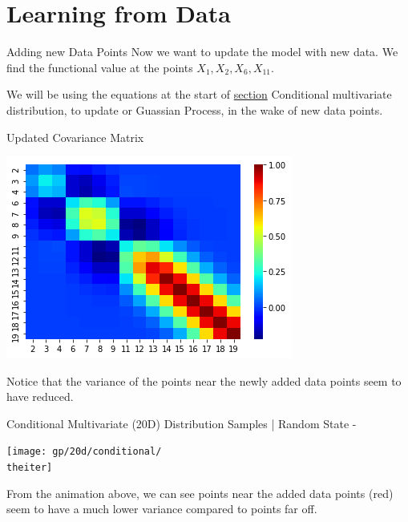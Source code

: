 \documentclass{beamer}
\begin{document}
\section{Learning from Data}

\begin{frame}{Adding new Data Points}
	Now we want to update the model with new data. We find the functional value at the points $X_1, X_2, X_6, X_{11}$.
	
	We will be using the equations at the start of \hyperref[sec:condMul]{section} Conditional multivariate distribution, to update or Guassian Process, in the wake of new data points.
\end{frame}

\begin{frame}{Updated Covariance Matrix}
	\begin{center}
		\includegraphics[width=\linewidth, height=\textheight -120pt ,keepaspectratio]{gp/post20d}
	\end{center}
	Notice that the variance of the points near the newly added data points seem to have reduced.
\end{frame}

%
{%
	\begin{frame}{Conditional Multivariate (20D) Distribution Samples | Random State - \theiter}
		\begin{center}
			\texttt{[image: gp/20d/conditional/\\theiter]}
		\end{center}
		From the animation above, we can see points near the added data points (red) seem to have a much lower variance compared to points far off.
	\end{frame}
}
\end{document}
